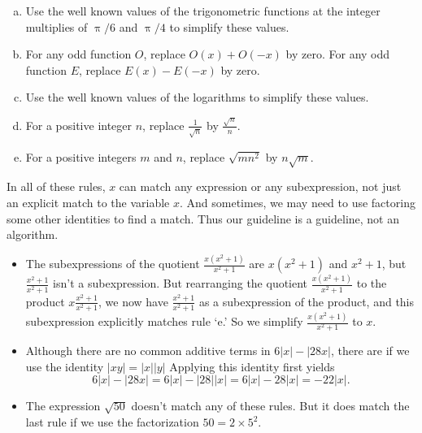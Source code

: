 \documentclass[12pt,fleqn]{article}
\newenvironment{alphalist}{
  \begin{enumerate}[(a)]
    \addtolength{\itemsep}{-0.5\itemsep}}
  {\end{enumerate}}
\begin{document}
{\begin{tcolorbox}
\begin{alphalist}
\item Use the well known values of the trigonometric functions at the integer multiplies of $\uppi/6$ and $\uppi/4$ to simplify these values.

\item For any odd function $O$, replace $O(x) + O(-x)$ by zero. For any odd function $E$, replace $E(x) - E(-x)$ by zero.

\item Use the well known values of the logarithms to simplify these values.

\item For a positive integer $n$, replace $\frac{1}{\sqrt{n}}$ by $\frac{\sqrt{n}}{n}$.

\item For a positive integers $m$ and $n$, replace $\sqrt{m n^2}$ by $n \sqrt{m}$. 

\end{alphalist}
\end{tcolorbox}

\noindent In all of these rules, $x$ can match any expression or any subexpression, not just an explicit match to the variable $x$.  And sometimes, we may need to use factoring some other identities to find a match.  Thus our guideline is a guideline, not an algorithm.  




\begin{itemize}
\item The subexpressions of the quotient  $\displaystyle \frac{x (x^2+1)}{x^2 + 1}$ are $x (x^2+1)$ and $x^2 + 1$, but
$\frac{x^2+1}{x^2 + 1}$ isn't a subexpression.  But rearranging the quotient $\displaystyle \frac{x (x^2+1)}{x^2 + 1}$ to the product $\displaystyle x \frac{x^2+1}{x^2 + 1}$, we now have $ \frac{x^2+1}{x^2 + 1}$ as a subexpression of the product, and this subexpression 
explicitly matches rule `e.' So we simplify $\displaystyle \frac{x (x^2+1)}{x^2 + 1}$ to $x$.

\item Although there are no common additive terms in $ 6 |x| - |28 x|$, there are if we use the identity $|x y| = |x| |y|$  Applying this identity
first yields
\[
    6 |x| - |28 x| = 6 |x| - |28| |x| = 6 |x| - 28 |x| = -22 |x|.
\]

\item The expression $\sqrt{50}$ doesn't match any of these rules.  But it does match the last rule if we use the factorization $50 = 2 \times 5^2$.

\end{itemize}



}
\end{document}

